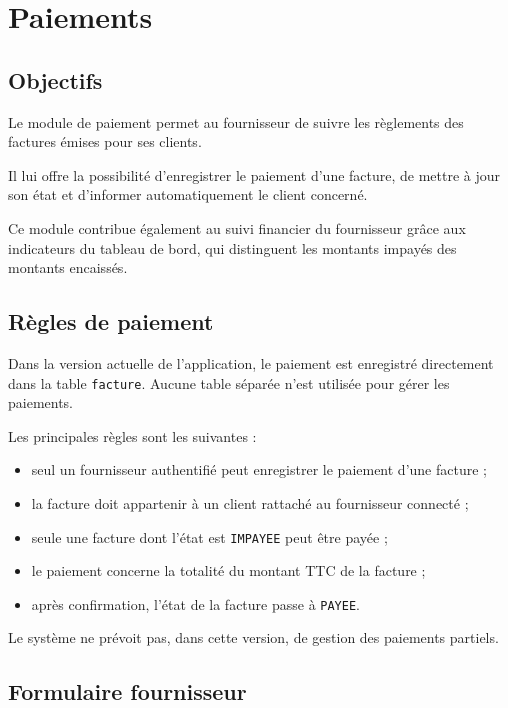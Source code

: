 
\chapter{Paiements}
\label{chap:paiements}

\section{Objectifs}

Le module de paiement permet au fournisseur de suivre les règlements des factures émises pour ses clients.

Il lui offre la possibilité d'enregistrer le paiement d'une facture, de mettre à jour son état et d'informer automatiquement le client concerné.

Ce module contribue également au suivi financier du fournisseur grâce aux indicateurs du tableau de bord, qui distinguent les montants impayés des montants encaissés.

\section{Règles de paiement}

Dans la version actuelle de l'application, le paiement est enregistré directement dans la table \texttt{facture}. Aucune table séparée n'est utilisée pour gérer les paiements.

Les principales règles sont les suivantes :
\begin{itemize}
    \item seul un fournisseur authentifié peut enregistrer le paiement d'une facture ;
    \item la facture doit appartenir à un client rattaché au fournisseur connecté ;
    \item seule une facture dont l'état est \texttt{IMPAYEE} peut être payée ;
    \item le paiement concerne la totalité du montant TTC de la facture ;
    \item après confirmation, l'état de la facture passe à \texttt{PAYEE}.
\end{itemize}

Le système ne prévoit pas, dans cette version, de gestion des paiements partiels.

\section{Formulaire fournisseur}

